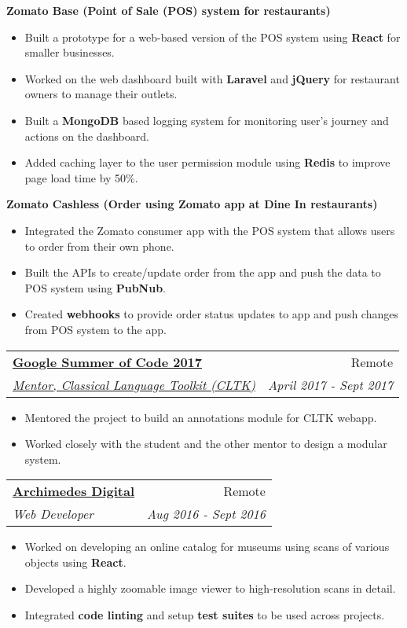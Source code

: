 \documentclass[letterpaper,11pt]{article}
\makeatletter
\newcommand{\resumeItemNoBold}[1]{
  \item\small{
    {#1 \vspace{-2pt}}
  }
}
\newcommand{\resumeSubheading}[4]{
  \vspace{-1pt}\item
    \begin{tabular*}{0.97\textwidth}{l@{\extracolsep{\fill}}r}
      \textbf{#1} & #2 \\
      \textit{\small#3} & \textit{\small #4} \\
    \end{tabular*}\vspace{-5pt}
}
\newcommand{\resumeItemListStart}{\begin{itemize}}
\newcommand{\resumeItemListEnd}{\end{itemize}\vspace{-5pt}}
\newcommand{\resumeItemListHeading}[1]{\textbf{#1}\vspace{-5pt}}
\makeatother
\begin{document}
      \resumeItemListHeading{Zomato Base (Point of Sale (POS) system for restaurants)}
      \resumeItemListStart
          \resumeItemNoBold
          {Built a prototype for a web-based version of the POS system using \textbf{React} for smaller businesses.}
          \resumeItemNoBold
          {Worked on the web dashboard built with \textbf{Laravel} and \textbf{jQuery} for restaurant owners to manage their outlets.}
           \resumeItemNoBold
          {Built a \textbf{MongoDB} based logging system for monitoring user's journey and actions on the dashboard.}
          \resumeItemNoBold
          {Added caching layer to the user permission module using \textbf{Redis} to improve page load time by 50\%.}
      \resumeItemListEnd
      
      \resumeItemListHeading{Zomato Cashless (Order using Zomato app at Dine In restaurants)}
      \resumeItemListStart
          \resumeItemNoBold
          {Integrated the Zomato consumer app with the POS system that allows users to order from their own phone.}
          \resumeItemNoBold
          {Built the APIs to create/update order from the app and push the data to POS system using \textbf{PubNub}.}
          \resumeItemNoBold
          {Created \textbf{webhooks} to provide order status updates to app and push changes from POS system to the app.}
      \resumeItemListEnd
      
      \resumeSubheading
      {\href{https://summerofcode.withgoogle.com/archive/2017/projects/6041859612737536/}{\underline{Google Summer of Code 2017}}}{Remote}
      {\href{http://cltk.org/}{Mentor, Classical Language Toolkit (CLTK)}}{April 2017 - Sept 2017}
      \resumeItemListStart
          \resumeItemNoBold
          {Mentored the project to build an annotations module for CLTK webapp.}
          \resumeItemNoBold
          {Worked closely with the student and the other mentor to design a modular system.}
      \resumeItemListEnd
      
	\resumeSubheading
      {\href{https://archimedes.digital}{\underline{Archimedes Digital}}}{Remote}
      {Web Developer}{Aug 2016 - Sept 2016}
      \resumeItemListStart
        \resumeItemNoBold
          {Worked on developing an online catalog for museums using scans of various objects using \textbf{React}.}
        \resumeItemNoBold
          {Developed a highly zoomable image viewer to high-resolution scans in detail.}
        \resumeItemNoBold
          {Integrated \textbf{code linting} and setup \textbf{test suites} to be used across projects.}
      \resumeItemListEnd
\end{document}
